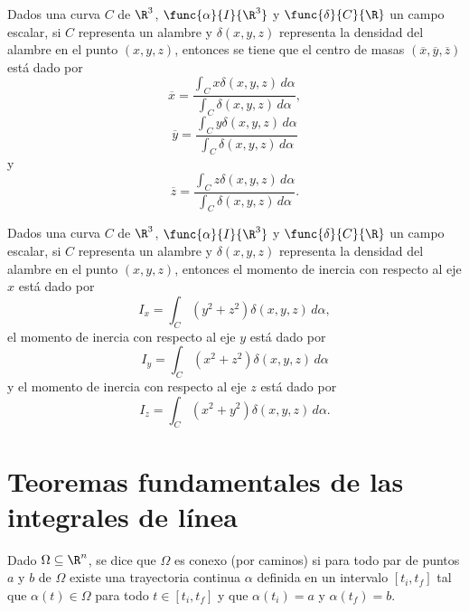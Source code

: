 \documentclass[a4,11pt]{aleph-notas}
\begin{document}

\begin{advertencia}
    Dados una curva $C$ de $\R^3$, $\func{\alpha}{I}{\R^3}$  y $\func{\delta}{C}{\R}$ un campo escalar, si $C$ representa un alambre y $\delta(x,y,z)$ representa la densidad del alambre en el punto $(x,y,z)$, entonces se tiene que el centro de masas $(\overline{x},\overline{y},\overline{z})$ está dado por
    \[
        \overline{x}=
        \frac{\int_C x\delta(x,y,z)\, d\alpha}
        {\int_C \delta(x,y,z)\, d\alpha},
    \]
    \[
        \overline{y}=
        \frac{\int_C y\delta(x,y,z)\, d\alpha}
        {\int_C \delta(x,y,z)\, d\alpha}
    \]
    y
    \[
        \overline{z}=
        \frac{\int_C z\delta(x,y,z)\, d\alpha}
        {\int_C \delta(x,y,z)\, d\alpha}.
    \]
\end{advertencia}


\begin{advertencia}
    Dados una curva $C$ de $\R^3$, $\func{\alpha}{I}{\R^3}$ y $\func{\delta}{C}{\R}$ un campo escalar, si $C$ representa un alambre y $\delta(x,y,z)$ representa la densidad del alambre en el punto $(x,y,z)$, entonces el momento de inercia con respecto al eje $x$ está dado por
    \[
        I_x =
        \int_C (y^2+z^2)\delta(x,y,z)\, d\alpha,
    \]
    el momento de inercia con respecto al eje $y$ está dado por
    \[
        I_y =
        \int_C (x^2+z^2)\delta(x,y,z)\, d\alpha
    \]
    y el momento de inercia con respecto al eje $z$ está dado por
    \[
        I_z =
        \int_C (x^2+y^2)\delta(x,y,z)\, d\alpha.
    \]
\end{advertencia}


\section{Teoremas fundamentales de las integrales de línea}


\begin{defi}
    Dado $\Omega\subseteq \R^n$, se dice que $\Omega$ es conexo (por caminos) si para todo par de puntos $a$ y $b$ de $\Omega$ existe una trayectoria continua $\alpha$ definida en un intervalo $[t_i,t_f]$ tal que $\alpha(t)\in \Omega$ para todo $t\in[t_i,t_f]$ y que $\alpha(t_i)=a$ y $\alpha(t_f)=b$.
\end{defi}
\end{document}
